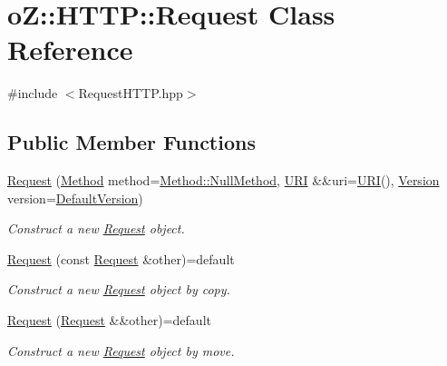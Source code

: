 \hypertarget{classo_z_1_1_h_t_t_p_1_1_request}{}\section{oZ\+::H\+T\+TP\+::Request Class Reference}
\label{classo_z_1_1_h_t_t_p_1_1_request}


{\ttfamily \#include $<$Request\+H\+T\+T\+P.\+hpp$>$}

\subsection*{Public Member Functions}
\begin{DoxyCompactItemize}
\item 
\mbox{\hyperlink{classo_z_1_1_h_t_t_p_1_1_request_acc69cd33d01a659ec94ae669cdbdba2a}{Request}} (\mbox{\hyperlink{namespaceo_z_1_1_h_t_t_p_a02d8497e4abbb0adf3af0fe9fad1b7a6}{Method}} method=\mbox{\hyperlink{namespaceo_z_1_1_h_t_t_p_a02d8497e4abbb0adf3af0fe9fad1b7a6a82b54b33ea69c9433dc272365308285b}{Method\+::\+Null\+Method}}, \mbox{\hyperlink{namespaceo_z_1_1_h_t_t_p_a6d47156e2eac27750983fc1b54bd2ff8}{U\+RI}} \&\&uri=\mbox{\hyperlink{namespaceo_z_1_1_h_t_t_p_a6d47156e2eac27750983fc1b54bd2ff8}{U\+RI}}(), \mbox{\hyperlink{structo_z_1_1_h_t_t_p_1_1_version}{Version}} version=\mbox{\hyperlink{namespaceo_z_1_1_h_t_t_p_af1d13b042d8595fb3196ce91c5c4955d}{Default\+Version}})
\begin{DoxyCompactList}\small\item\em Construct a new \mbox{\hyperlink{classo_z_1_1_h_t_t_p_1_1_request}{Request}} object. \end{DoxyCompactList}\item 
\mbox{\hyperlink{classo_z_1_1_h_t_t_p_1_1_request_a0912395e7f1d4b61ceb28754ba02498f}{Request}} (const \mbox{\hyperlink{classo_z_1_1_h_t_t_p_1_1_request}{Request}} \&other)=default
\begin{DoxyCompactList}\small\item\em Construct a new \mbox{\hyperlink{classo_z_1_1_h_t_t_p_1_1_request}{Request}} object by copy. \end{DoxyCompactList}\item 
\mbox{\hyperlink{classo_z_1_1_h_t_t_p_1_1_request_ab2033d92faeb72d7488477cc4f9859d5}{Request}} (\mbox{\hyperlink{classo_z_1_1_h_t_t_p_1_1_request}{Request}} \&\&other)=default
\begin{DoxyCompactList}\small\item\em Construct a new \mbox{\hyperlink{classo_z_1_1_h_t_t_p_1_1_request}{Request}} object by move. \end{DoxyCompactList}\item 

\end{DoxyCompactItemize}
